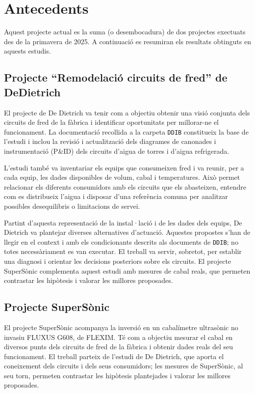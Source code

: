 \documentclass[
  paper=a4,
  oneside  ,captions=tableheading
]{scrartcl}
\begin{document}
\section{Antecedents}\label{antecedents}

Aquest projecte actual es la suma (o desembocadura) de dos projectes
exectuats des de la primavera de 2025. A continuació es resumiran els
resultats obtinguts en aquests estudis.

\subsection{Projecte ``Remodelació circuits de fred'' de
DeDietrich}\label{projecte-remodelaciuxf3-circuits-de-fred-de-dedietrich}

El projecte de De Dietrich va tenir com a objectiu obtenir una visió
conjunta dels circuits de fred de la fàbrica i identificar oportunitats
per millorar-ne el funcionament. La documentació recollida a la carpeta
\texttt{DDIB} constitueix la base de l'estudi i inclou la revisió i
actualització dels diagrames de canonades i instrumentació (P\&ID) dels
circuits d'aigua de torres i d'aigua refrigerada.

L'estudi també va inventariar els equips que consumeixen fred i va
reunir, per a cada equip, les dades disponibles de volum, cabal i
temperatures. Això permet relacionar els diferents consumidors amb els
circuits que els abasteixen, entendre com es distribueix l'aigua i
disposar d'una referència comuna per analitzar possibles desequilibris o
limitacions de servei.

Partint d'aquesta representació de la instal·lació i de les dades dels
equips, De Dietrich va plantejar diverses alternatives d'actuació.
Aquestes propostes s'han de llegir en el context i amb els condicionants
descrits als documents de \texttt{DDIB}; no totes necessàriament es van
executar. El treball va servir, sobretot, per establir una diagnosi i
orientar les decisions posteriors sobre els circuits. El projecte
SuperSònic complementa aquest estudi amb mesures de cabal reals, que
permeten contrastar les hipòtesis i valorar les millores proposades.

\subsection{Projecte SuperSònic}\label{projecte-supersuxf2nic}

El projecte SuperSònic acompanya la inversió en un cabalímetre
ultrasònic no invasiu FLUXUS G608, de FLEXIM. Té com a objectiu mesurar
el cabal en diversos punts dels circuits de fred de la fàbrica i obtenir
dades reals del seu funcionament. El treball parteix de l'estudi de De
Dietrich, que aporta el coneixement dels circuits i dels seus
consumidors; les mesures de SuperSònic, al seu torn, permeten contrastar
les hipòtesis plantejades i valorar les millores proposades.
\end{document}
